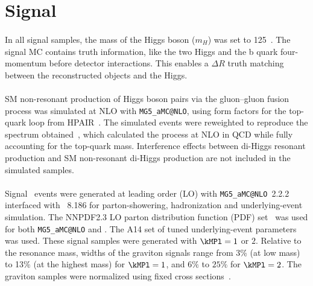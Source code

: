 \section{Signal}
\paragraph{}
In all signal samples, the mass of the Higgs boson ($m_H$) was set to 125~\GeV. 
The signal MC contains truth information, like the two Higgs and the b quark four-momentum before detector interactions. 
This enables a $\Delta R$ truth matching between the reconstructed objects and the Higgs.

\paragraph{}
SM non-resonant production of Higgs boson pairs via the gluon--gluon fusion process was simulated at NLO with \texttt{MG5\_aMC@NLO}, using form factors for the top-quark loop from HPAIR~\cite{PhysRevD.58.115012, Plehn199646}. The simulated events were reweighted to reproduce the \mhh spectrum obtained~\cite{Borowka:2016ehy, Borowka:2016ypz}, which calculated the process at NLO in QCD while fully accounting for the top-quark mass. 
Interference effects between di-Higgs resonant production and SM non-resonant di-Higgs production are not included in the simulated samples. 

\paragraph{}
Signal \Gtohhb\ events were generated at leading order (LO) with \texttt{MG5\_aMC@NLO}~2.2.2~\cite{MGaMCatNLO} interfaced with \pythia~8.186 for parton-showering, hadronization and underlying-event simulation. 
The NNPDF2.3 LO parton distribution function (PDF) set~\cite{Ball:2012cx} was used for both \texttt{MG5\_aMC@NLO} and \pythia. 
The A14 set of tuned underlying-event parameters was used. 
These signal samples were generated with $\kMPl = 1$ or $2$.
Relative to the resonance mass, widths of the graviton signals range from 3\% (at low mass) to 13\% (at the highest mass) for $\kMPl=1$, and $6\%$ to $25\%$ for $\kMPl=2$.
The graviton samples were normalized using fixed cross sections~\cite{carvalho}.

